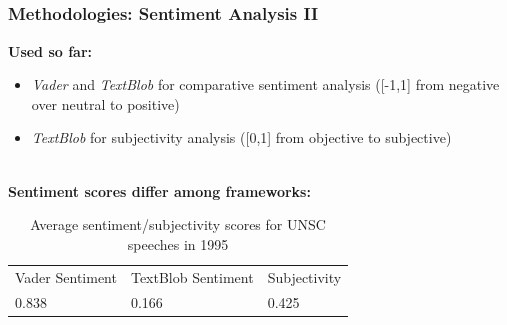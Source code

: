 \documentclass{beamer}
\begin{document}
\subsection{}
\begin{framefont}{\footnotesize}
	\begin{frame}
		\frametitle{Methodologies: Sentiment Analysis II}
		
		\textbf{Used so far:}
		\begin{itemize}
			\setlength\itemsep{1.2em}
			\item \textit{Vader} and \textit{TextBlob} for comparative sentiment analysis ([-1,1] from negative over neutral to positive)
			\item \textit{TextBlob} for subjectivity analysis ([0,1] from objective to subjective)
			 

		\end{itemize}
		\\[10]
		\textbf{Sentiment scores differ among frameworks:}
				\begin{table}[]
        \begin{tabular}{|l|l|l|}
        \hline
        Vader Sentiment & TextBlob Sentiment & Subjectivity \\ \hhline{|=|=|=|}
        0.838                & 0.166                   & 0.425             \\ \hline
        
        \end{tabular}
        \\[3] %
  \caption{Average sentiment/subjectivity scores for UNSC speeches in 1995}
  \\[3]
        \end{table}
	\end{frame}
\end{framefont}
\end{document}
